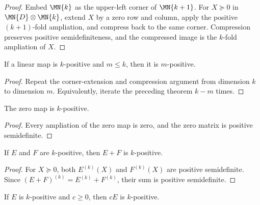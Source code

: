 \begin{proof}
    \leanok
    Embed $\MN{k}$ as the upper-left corner of $\MN{k+1}$. For
    $X\succeq0$ in $\MN{D}\otimes\MN{k}$, extend $X$ by a zero row and
    column, apply the positive $(k+1)$-fold ampliation, and compress back to
    the same corner. Compression preserves positive semidefiniteness, and the
    compressed image is the $k$-fold ampliation of $X$.
\end{proof}

\begin{theorem}
    \label{thm:k_positive_mono}
    \leanok
    If a linear map is $k$-positive and $m \le k$, then it is $m$-positive.
\end{theorem}

\begin{proof}
    \leanok
    Repeat the corner-extension and compression argument from dimension $k$
    to dimension $m$. Equivalently, iterate the preceding theorem $k-m$
    times.
\end{proof}

\begin{theorem}
    \label{thm:k_positive_zero}
    \leanok
    The zero map is $k$-positive.
\end{theorem}

\begin{proof}
    \leanok
    Every ampliation of the zero map is zero, and the zero matrix is positive
    semidefinite.
\end{proof}

\begin{theorem}
    \label{thm:k_positive_add}
    \leanok
    If $E$ and $F$ are $k$-positive, then $E+F$ is $k$-positive.
\end{theorem}

\begin{proof}
    \leanok
    For $X\succeq0$, both $E^{(k)}(X)$ and $F^{(k)}(X)$ are positive
    semidefinite. Since $(E+F)^{(k)}=E^{(k)}+F^{(k)}$, their sum is positive
    semidefinite.
\end{proof}

\begin{theorem}
    \label{thm:k_positive_smul_nonneg}
    \leanok
    If $E$ is $k$-positive and $c \ge 0$, then $cE$ is $k$-positive.
\end{theorem}

